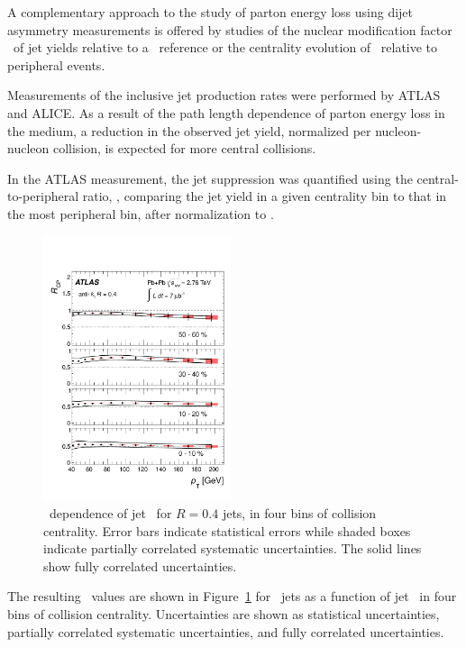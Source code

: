 A complementary approach to the study of parton energy loss using dijet asymmetry measurements
is offered by studies of the nuclear modification factor \Raa\ of jet yields relative
to a \pp\ reference or the centrality evolution of \Rcp\ relative to peripheral events.

Measurements of the inclusive jet production rates were performed by ATLAS and ALICE.
As a result of the path length dependence of parton energy loss in the medium,
\cite{Armesto:2011ht} a reduction in the observed jet yield, normalized per
nucleon-nucleon collision, is expected for more central collisions.

In the ATLAS measurement, the jet suppression was quantified using the central-to-peripheral ratio,
\Rcp, comparing the jet yield in a given centrality bin to that in the most peripheral bin, after
normalization to \Ncoll.

\begin{figure}[!th]
\begin{center}
\includegraphics[width=0.49\textwidth]{jetfigures/ATLAS_jetRCP_04.pdf}
\caption{
\pT\ dependence of jet \Rcp\ for  $R=0.4$ jets,
in four bins of collision centrality. Error bars indicate
statistical errors while shaded boxes indicate
partially correlated systematic uncertainties.
The solid lines show fully correlated uncertainties.
}
\label{fig:GR:rcprfour}
\end{center}
\end{figure}
The resulting \Rcp\ values are shown in Figure~\ref{fig:GR:rcprfour}
for  \RFour\ jets as a function of jet \pT\ in four bins
of collision centrality.
Uncertainties are shown as statistical uncertainties, partially correlated systematic
uncertainties, and fully correlated uncertainties.

